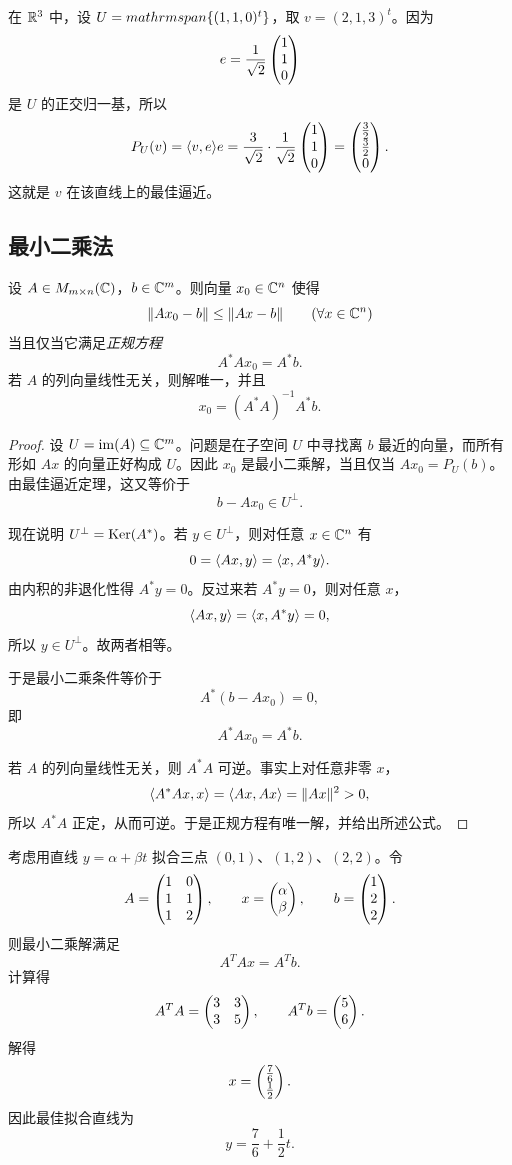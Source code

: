 \begin{example}
在 $\mathbb{R}^3$ 中，设 $U=\\mathrm{span}\{(1,1,0)^t\}$，取 $v=(2,1,3)^t$。因为
\[
e=\frac{1}{\sqrt2}\begin{pmatrix} 1\\1\\0 \end{pmatrix}
\]
是 $U$ 的正交归一基，所以
\[
P_U(v)=\langle v, e \rangle e=\frac{3}{\sqrt2}\cdot \frac{1}{\sqrt2}\begin{pmatrix} 1\\1\\0 \end{pmatrix}=\begin{pmatrix} \tfrac32\\\tfrac32\\0 \end{pmatrix}.
\]
这就是 $v$ 在该直线上的最佳逼近。
\end{example}

\subsection{最小二乘法}

\begin{theorem}[最小二乘与正规方程]
设 $A\in M_{m\times n}(\mathbb{C})$，$b\in\mathbb{C}^m$。则向量 $x_0\in\mathbb{C}^n$ 使得
\[
\|Ax_0-b\|\le \|Ax-b\|\qquad (\forall x\in\mathbb{C}^n)
\]
当且仅当它满足\emph{正规方程}
\[
A^*Ax_0=A^*b.
\]
若 $A$ 的列向量线性无关，则解唯一，并且
\[
x_0=(A^*A)^{-1}A^*b.
\]
\end{theorem}

\begin{proof}
设 $U=\operatorname{im}(A)\subseteq \mathbb{C}^m$。问题是在子空间 $U$ 中寻找离 $b$ 最近的向量，而所有形如 $Ax$ 的向量正好构成 $U$。因此 $x_0$ 是最小二乘解，当且仅当 $Ax_0=P_U(b)$。由最佳逼近定理，这又等价于
\[
b-Ax_0\in U^{\perp}.
\]

现在说明 $U^{\perp}=\mathrm{Ker}(A^*)$。若 $y\in U^{\perp}$，则对任意 $x\in\mathbb{C}^n$ 有
\[
0=\langle Ax, y \rangle=\langle x, A^*y \rangle.
\]
由内积的非退化性得 $A^*y=0$。反过来若 $A^*y=0$，则对任意 $x$，
\[
\langle Ax, y \rangle=\langle x, A^*y \rangle=0,
\]
所以 $y\in U^{\perp}$。故两者相等。

于是最小二乘条件等价于
\[
A^*(b-Ax_0)=0,
\]
即
\[
A^*Ax_0=A^*b.
\]

若 $A$ 的列向量线性无关，则 $A^*A$ 可逆。事实上对任意非零 $x$，
\[
\langle A^*Ax, x \rangle=\langle Ax, Ax \rangle=\|Ax\|^2>0,
\]
所以 $A^*A$ 正定，从而可逆。于是正规方程有唯一解，并给出所述公式。
\end{proof}

\begin{example}
考虑用直线 $y=\alpha+\beta t$ 拟合三点 $(0,1)$、$(1,2)$、$(2,2)$。令
\[
A=\begin{pmatrix} 1&0\\1&1\\1&2 \end{pmatrix},\qquad x=\begin{pmatrix} \alpha\\\beta \end{pmatrix},\qquad b=\begin{pmatrix} 1\\2\\2 \end{pmatrix}.
\]
则最小二乘解满足
\[
A^TAx=A^Tb.
\]
计算得
\[
A^TA=\begin{pmatrix} 3&3\\3&5 \end{pmatrix},\qquad A^Tb=\begin{pmatrix} 5\\6 \end{pmatrix}.
\]
解得
\[
x=\begin{pmatrix} \tfrac76\\\tfrac12 \end{pmatrix}.
\]
因此最佳拟合直线为
\[
y=\frac76+\frac12 t.
\]
\end{example}

